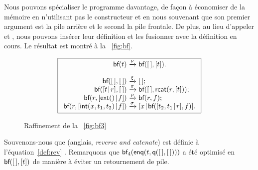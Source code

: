 Nous pouvons spécialiser le programme davantage, de façon à économiser
de la mémoire en n'utilisant pas le constructeur
 et en nous souvenant que son premier
argument est la pile arrière et le second la pile frontale. De plus,
au lieu d'appeler  et
, nous pouvons insérer leur
définition et les fusionner avec la définition en cours. Le résultat
est montré à la \fig~\vref{fig:bf}.
\begin{figure}
\begin{equation*}
\boxed{
\begin{array}{r@{\;}c@{\;}l}
\fun{bf}(t) & \xrightarrow{\smash{\nu}} & \fun{bf}(\el,[t]).\\
\\
\fun{bf}(\el,\el) & \xrightarrow{\smash{\xi}} & \el;\\
\fun{bf}(\cons{t}{r},\el) & \xrightarrow{\smash{\pi}} &
  \fun{bf}(\el,\fun{rcat}(r,[t]));\\
\fun{bf}(r,\cons{\fun{ext}()}{f})
  & \xrightarrow{\smash{\rho}} & \fun{bf}(r,f);\\
\fun{bf}(r,\cons{\fun{int}(x,t_1,t_2)}{f})
  & \xrightarrow{\smash{\sigma}}
  & \cons{x}{\fun{bf}(\cons{t_2,t_1}{r},f)}.
\end{array}}
\end{equation*}
\caption{Raffinement de la \fig~\vref{fig:bf3}}
\label{fig:bf}
\end{figure}
Souvenons-nous que  (anglais,
\emph{reverse and catenate}) est définie à l'équation~\eqref{def:rev}
. Remarquons que
\(\textsf{bf}_4(\textsf{enq}(t,\textsf{q}([\,],[\,])))\)
a été optimisé en \(\textsf{bf}([\,],[t])\) de
manière à éviter un retournement de pile.

